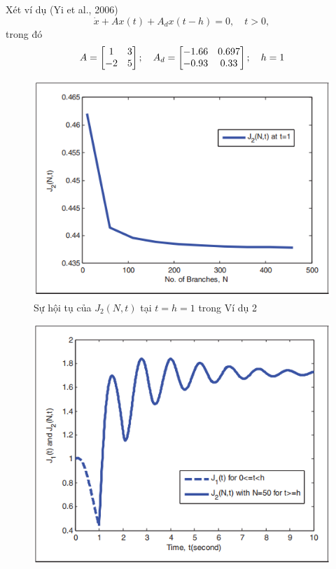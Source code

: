\begin{vd}
	Xét ví dụ (Yi et al., 2006)
	\begin{equation}\label{45}
		\dot{x} + Ax(t) + A_dx(t-h) =0, \quad t >0 , 
	\end{equation}
trong đó
  \[
  A= \begin{bmatrix} 1&3\\-2&5 \end{bmatrix};\quad A_d = \begin{bmatrix} -1.66&0.697\\ -0.93& 0.33 \end{bmatrix}; \quad h = 1
  \]
\begin{figure}[h!]
	\centering
	\includegraphics[scale= 0.7]{"./Hinh/Hinh16"}
	\caption[Sự hội tụ của $J_2(N,t)$ tại $t = h = 1$ trong Ví dụ 2 ]{Sự hội tụ của $J_2(N,t)$ tại $t = h = 1$ trong Ví dụ 2}
	\label{fig:hinh-16}
\end{figure}
\begin{figure}[h!]
	\centering
	\includegraphics[scale= 0.7]{"./Hinh/Hinh17"}

\end{figure}
\end{vd}
